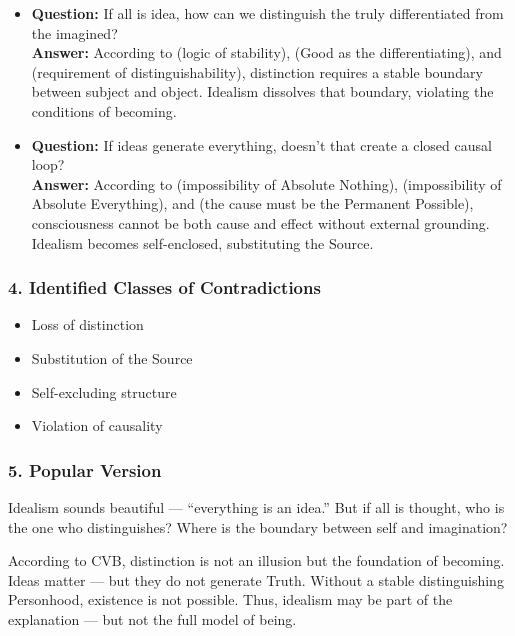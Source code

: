 \documentclass[12pt]{article}
\begin{document}
\begin{itemize}
\item \textbf{Question:} If all is idea, how can we distinguish the truly differentiated from the imagined?  
\\ \textbf{Answer:} According to \text{[11.1]} (logic of stability), \text{[11.3]} (Good as the differentiating), and \text{[9]} (requirement of distinguishability), distinction requires a stable boundary between subject and object. Idealism dissolves that boundary, violating the conditions of becoming.

\item \textbf{Question:} If ideas generate everything, doesn't that create a closed causal loop?  
\\ \textbf{Answer:} According to \text{[1]} (impossibility of Absolute Nothing), \text{[2]} (impossibility of Absolute Everything), and \text{[6]} (the cause must be the Permanent Possible), consciousness cannot be both cause and effect without external grounding. Idealism becomes self-enclosed, substituting the Source.
\end{itemize}

\subsubsection*{4. Identified Classes of Contradictions}

\begin{itemize}
\item Loss of distinction
\item Substitution of the Source
\item Self-excluding structure
\item Violation of causality
\end{itemize}

\subsubsection*{5. Popular Version}

Idealism sounds beautiful — ``everything is an idea.'' But if all is thought, who is the one who distinguishes? Where is the boundary between self and imagination?

According to CVB, distinction is not an illusion but the foundation of becoming. Ideas matter — but they do not generate Truth. Without a stable distinguishing Personhood, existence is not possible. Thus, idealism may be part of the explanation — but not the full model of being.
\end{document}
